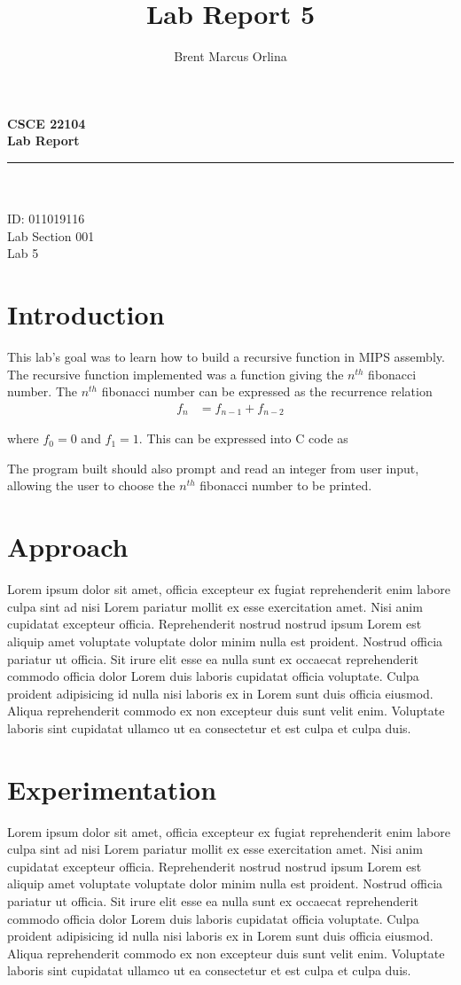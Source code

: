 \documentclass[11pt]{report}
\makeatletter
\newcommand{\@labsection}{000}
\newcommand{\labsection}[1]{
    \renewcommand{\@labsection}{#1}
}
\newcommand{\@labnumber}{0}
\newcommand{\labnumber}[1]{
    \renewcommand{\@labnumber}{#1}
}
\newcommand{\@shortsubmitted}{1/1/70}
\newcommand{\shortsubmitted}[1]{
    \renewcommand{\@shortsubmitted}{#1}
}
\renewcommand{\maketitle}{
    \newgeometry{left=1in, right=1in, top=1.75in, textheight=8.25in}
    \singlespacing
    \begin{center}
        {\huge \bf CSCE 22104} \\
        \vspace{2.5em}
        {\Large \bf Lab Report} \\
        \vspace{2em}
        \noindent\rule{20em}{0.4pt} \\
        \vspace{1em}
        {\Large \@author} \\
        \vspace{.75em}
        {\normalsize ID: 011019116} \\
        \vspace{.75em}
        {\normalsize Lab Section \@labsection} \\
        \vspace{.75em}
        {\normalsize Lab \@labnumber} \\
    \end{center}
    \newpage
    \restoregeometry
}
\makeatother
\begin{document}
\title{Lab Report 5}
\author{Brent Marcus Orlina}

\labsection{001}
\labnumber{5}

\shortsubmitted{3/12/25}

\maketitle

\section*{Introduction}
This lab's goal was to learn how to build a recursive function in MIPS assembly. The recursive
function implemented was a function giving the $n^{th}$ fibonacci number. The $n^{th}$
fibonacci number can be expressed as the recurrence relation
\begin{align*}
    f_n &= f_{n - 1} + f_{n - 2}
\end{align*}

where $f_0 = 0$ and $f_1 = 1$. This can be expressed into C code as

The program built should also prompt and read an integer from user input, allowing the user to
choose the $n^{th}$ fibonacci number to be printed. 

\newpage

\section*{Approach}
Lorem ipsum dolor sit amet, officia excepteur ex fugiat reprehenderit enim labore culpa sint ad nisi
Lorem pariatur mollit ex esse exercitation amet. Nisi anim cupidatat excepteur officia.
Reprehenderit nostrud nostrud ipsum Lorem est aliquip amet voluptate voluptate dolor minim nulla est
proident. Nostrud officia pariatur ut officia. Sit irure elit esse ea nulla sunt ex occaecat
reprehenderit commodo officia dolor Lorem duis laboris cupidatat officia voluptate. Culpa proident
adipisicing id nulla nisi laboris ex in Lorem sunt duis officia eiusmod. Aliqua reprehenderit
commodo ex non excepteur duis sunt velit enim. Voluptate laboris sint cupidatat ullamco ut ea
consectetur et est culpa et culpa duis.

\section*{Experimentation}
Lorem ipsum dolor sit amet, officia excepteur ex fugiat reprehenderit enim labore culpa sint ad nisi
Lorem pariatur mollit ex esse exercitation amet. Nisi anim cupidatat excepteur officia.
Reprehenderit nostrud nostrud ipsum Lorem est aliquip amet voluptate voluptate dolor minim nulla est
proident. Nostrud officia pariatur ut officia. Sit irure elit esse ea nulla sunt ex occaecat
reprehenderit commodo officia dolor Lorem duis laboris cupidatat officia voluptate. Culpa proident
adipisicing id nulla nisi laboris ex in Lorem sunt duis officia eiusmod. Aliqua reprehenderit
commodo ex non excepteur duis sunt velit enim. Voluptate laboris sint cupidatat ullamco ut ea
consectetur et est culpa et culpa duis.
\end{document}
